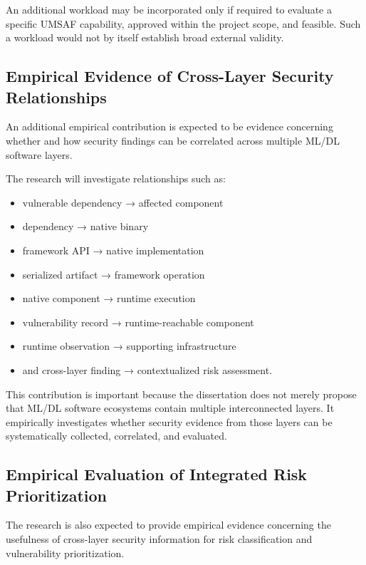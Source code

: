\documentclass[
  12pt,
  letterpaper,
  oneside]{report}
\providecommand{\tightlist}{%
  \setlength{\itemsep}{0pt}\setlength{\parskip}{0pt}}
\begin{document}
An additional workload may be incorporated only if required to evaluate
a specific UMSAF capability, approved within the project scope, and
feasible. Such a workload would not by itself establish broad external
validity.

\subsection{Empirical Evidence of Cross-Layer Security Relationships}\label{1234-empirical-evidence-of-cross-layer-security-relationships}

An additional empirical contribution is expected to be evidence
concerning whether and how security findings can be correlated across
multiple ML/DL software layers.

The research will investigate relationships such as:

\begin{itemize}
\tightlist
\item
  vulnerable dependency → affected component
\item
  dependency → native binary
\item
  framework API → native implementation
\item
  serialized artifact → framework operation
\item
  native component → runtime execution
\item
  vulnerability record → runtime-reachable component
\item
  runtime observation → supporting infrastructure
\item
  and cross-layer finding → contextualized risk assessment.
\end{itemize}

This contribution is important because the dissertation does not merely
propose that ML/DL software ecosystems contain multiple interconnected
layers. It empirically investigates whether security evidence from those
layers can be systematically collected, correlated, and evaluated.

\subsection{Empirical Evaluation of Integrated Risk Prioritization}\label{1235-empirical-evaluation-of-integrated-risk-prioritization}

The research is also expected to provide empirical evidence concerning
the usefulness of cross-layer security information for risk
classification and vulnerability prioritization.
\end{document}
